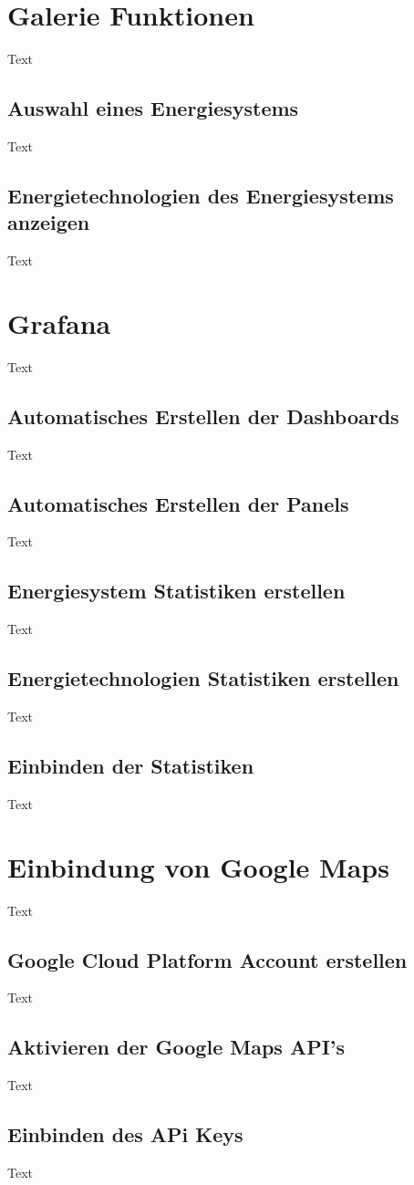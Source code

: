 \section{Galerie Funktionen}
Text
\subsection{Auswahl eines Energiesystems}
Text
\subsection{Energietechnologien des Energiesystems anzeigen}
Text


\section{Grafana}
Text
\subsection{Automatisches Erstellen der Dashboards}
Text
\subsection{Automatisches Erstellen der Panels}
Text
\subsection{Energiesystem Statistiken erstellen}
Text
\subsection{Energietechnologien Statistiken erstellen}
Text
\subsection{Einbinden der Statistiken}
Text

\section{Einbindung von Google Maps}
Text
\subsection{Google Cloud Platform Account erstellen}
Text
\subsection{Aktivieren der Google Maps API’s}
Text
\subsection{Einbinden des APi Keys}
Text
